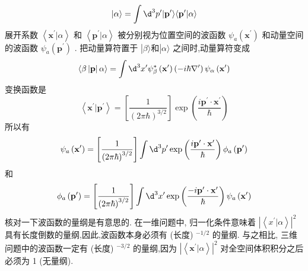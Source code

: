 \begin{equation}
	| {\alpha \rangle = \int {\d}^{3}{p}^{\prime }}| {\mathbf{p}}^{\prime }\rangle \langle {{\mathbf{p}}^{\prime } | \alpha }\rangle
\end{equation}
展开系数 $\left\langle {{\mathbf{x}}^{\prime } | \alpha }\right\rangle$ 和 $\left\langle {{\mathbf{p}}^{\prime } | \alpha }\right\rangle$ 被分别视为位置空间的波函数 ${\psi }_{a}\left( {\mathbf{x}}^{\prime }\right)$ 和动量空间的波函数 ${\psi }_{a}\left( {\mathbf{p}}^{\prime }\right)$ . 把动量算符置于 $\left| {\beta \rangle \text{和}}\right| \alpha \rangle$ 之间时,动量算符变成
\begin{equation}
	\langle \beta \left| \mathbf{p}\right| \alpha \rangle = \int {\d}^{3}{x}^{\prime }{\psi }_{\beta }^{ * }\left( {\mathbf{x}}^{\prime }\right) \left( {-i\hbar {\nabla }^{\prime }}\right) {\psi }_{\alpha }\left( {\mathbf{x}}^{\prime }\right)
\end{equation}
变换函数是
\begin{equation}
	\left\langle {{\mathbf{x}}^{\prime } | {\mathbf{p}}^{\prime }}\right\rangle = \left\lbrack \frac{1}{{\left( 2\pi \hbar \right) }^{3/2}}\right\rbrack \exp \left( \frac{i{\mathbf{p}}^{\prime } \cdot {\mathbf{x}}^{\prime }}{\hbar }\right)
\end{equation}
所以有
\begin{equation}
	{\psi }_{a}\left( {\mathbf{x}}^{\prime }\right) = \left\lbrack \frac{1}{{\left( 2\pi \hbar \right) }^{3/2}}\right\rbrack \int {\d}^{3}{p}^{\prime }\exp \left( \frac{i{\mathbf{p}}^{\prime } \cdot {\mathbf{x}}^{\prime }}{\hbar }\right) {\phi }_{a}\left( {\mathbf{p}}^{\prime }\right)
\end{equation}
和
\begin{equation}
	{\phi }_{a}\left( {\mathbf{p}}^{\prime }\right) = \left\lbrack \frac{1}{{\left( 2\pi \hbar \right) }^{3/2}}\right\rbrack \int {\d}^{3}{x}^{\prime }\exp \left( \frac{-i{\mathbf{p}}^{\prime } \cdot {\mathbf{x}}^{\prime }}{\hbar }\right) {\psi }_{a}\left( {\mathbf{x}}^{\prime }\right)
\end{equation}
核对一下波函数的量纲是有意思的. 在一维问题中, 归一化条件意味着 ${\left| \left\langle {x}^{\prime } | \alpha \right\rangle \right| }^{2}$ 具有长度倒数的量纲,因此,波函数本身必须有 (长度) ${}^{-1/2}$ 的量纲. 与之相比, 三维问题中的波函数一定有 (长度) ${}^{-3/2}$ 的量纲,因为 ${\left| \left\langle {\mathbf{x}}^{\prime } | \alpha \right\rangle \right| }^{2}$ 对全空间体积积分之后必须为 1 (无量纲).

